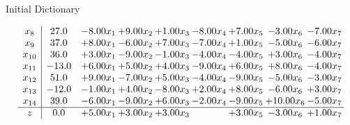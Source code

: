 \documentclass[8pt]{article}
\begin{document}
Initial Dictionary 

\[\begin{array}{c| c c@{\hskip 2pt} c@{\hskip 2pt} c@{\hskip 2pt} c@{\hskip 2pt} c@{\hskip 2pt} c@{\hskip 2pt} c@{\hskip 2pt} }
 x_{8}   &  27.0 & -8.00 x_{1} & +  9.00 x_{2} & +  1.00 x_{3} & -8.00 x_{4} & +  7.00 x_{5} & -3.00 x_{6} & -7.00 x_{7}\\
 x_{9}   &  37.0 & +  8.00 x_{1} & -6.00 x_{2} & +  7.00 x_{3} & -7.00 x_{4} & +  1.00 x_{5} & -5.00 x_{6} & -6.00 x_{7}\\
 x_{10}   &  36.0 & +  3.00 x_{1} & -9.00 x_{2} & -1.00 x_{3} & -4.00 x_{4} & -4.00 x_{5} & +  3.00 x_{6} & -4.00 x_{7}\\
 x_{11}   &  -13.0 & +  6.00 x_{1} & +  5.00 x_{2} & +  4.00 x_{3} & -9.00 x_{4} & +  6.00 x_{5} & +  8.00 x_{6} & -4.00 x_{7}\\
 x_{12}   &  51.0 & +  9.00 x_{1} & -7.00 x_{2} & +  5.00 x_{3} & -4.00 x_{4} & -9.00 x_{5} & -5.00 x_{6} & -3.00 x_{7}\\
 x_{13}   &  -12.0 & -1.00 x_{1} & +  4.00 x_{2} & -8.00 x_{3} & +  2.00 x_{4} & +  8.00 x_{5} & -6.00 x_{6} & +  3.00 x_{7}\\
 x_{14}   &  39.0 & -6.00 x_{1} & -9.00 x_{2} & +  6.00 x_{3} & -2.00 x_{4} & -9.00 x_{5} & + 10.00 x_{6} & -5.00 x_{7}\\
\hline
z    &  0.0 & +  5.00 x_{1} & +  3.00 x_{2} & +  3.00 x_{3} &   & +  3.00 x_{5} & -3.00 x_{6} & +  1.00 x_{7}\\
\end{array}\]
\end{document}
